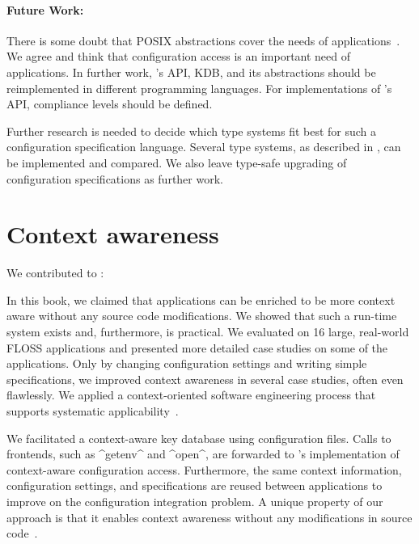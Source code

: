 \paragraph{Future Work:} There is some doubt that POSIX abstractions cover the needs of applications~\cite{atlidakis2016posix}.
We agree and think that configuration access is an important need of applications.
In further work, \elektra{}'s API, KDB, and its abstractions should be reimplemented in different programming languages.
For implementations of \elektra{}'s API, compliance levels should be defined.


Further research is needed to decide which type systems fit best for such a configuration specification language.
Several type systems, as described in , can be implemented and compared.
We also leave type-safe upgrading of configuration specifications as further work.

















\section{Context awareness}
\label{sec:conclusion-awareness}

We contributed to :
\goalContext*

In this book, we claimed that applications can be enriched to be more context aware without any source code modifications.
We showed that such a run-time system exists and, furthermore, is practical.
We evaluated \elektra{} on 16 large, real-world FLOSS applications and presented more detailed case studies on some of the applications.
Only by changing configuration settings and writing simple specifications, we improved context awareness in several case studies, often even flawlessly.
We applied a context-oriented software engineering process that supports systematic applicability~\cite{raab2017introducing}.

We facilitated a context-aware key database using configuration files.
Calls to frontends, such as ^getenv^ and ^open^, are forwarded to \elektra{}'s implementation of context-aware configuration access.
Furthermore, the same context information, configuration settings, and specifications are reused between applications to improve on the configuration integration problem.
A unique property of our approach is that it enables context awareness without any modifications in source code~\cite{raab2016unanticipated}.


